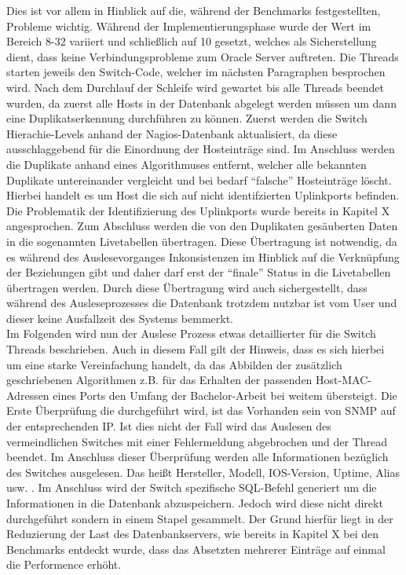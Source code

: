 Dies ist vor allem in Hinblick auf die, während der Benchmarks festgestellten, Probleme wichtig. Während der Implementierungsphase wurde der Wert im Bereich 8-32 variiert und schließlich auf 10 gesetzt, welches als Sicherstellung dient, dass keine Verbindungsprobleme zum Oracle Server auftreten. Die Threads starten jeweils den Switch-Code, welcher im nächsten Paragraphen besprochen wird. Nach dem Durchlauf der Schleife wird gewartet bis alle Threads beendet wurden, da zuerst alle Hosts in der Datenbank abgelegt werden müssen um dann eine Duplikatserkennung durchführen zu können. Zuerst werden die Switch Hierachie-Levels anhand der Nagios-Datenbank aktualisiert, da diese ausschlaggebend für die Einordnung der Hosteinträge sind. Im Anschluss werden die Duplikate anhand eines Algorithmuses entfernt, welcher alle bekannten Duplikate untereinander vergleicht und bei bedarf “falsche” Hosteinträge löscht. Hierbei handelt es um Host die sich auf nicht identifzierten Uplinkports befinden. Die Problematik der Identifizierung des Uplinkports wurde bereits in Kapitel X angesprochen. Zum Abschluss werden die von den Duplikaten gesäuberten Daten in die sogenannten Livetabellen übertragen. Diese Übertragung ist notwendig, da es während des Auslesevorganges Inkonsistenzen im Hinblick auf die Verknüpfung der Beziehungen gibt und daher darf erst der “finale” Status in die Livetabellen übertragen werden. Durch diese Übertragung wird auch sichergestellt, dass während des Ausleseprozesses die Datenbank trotzdem nutzbar ist vom User und dieser keine Ausfallzeit des Systems bemmerkt.\\
Im Folgenden wird nun der Auslese Prozess etwas detaillierter für die Switch Threads beschrieben. Auch in diesem Fall gilt der Hinweis, dass es sich hierbei um eine starke Vereinfachung handelt, da das Abbilden der zusätzlich geschriebenen Algorithmen z.B. für das Erhalten der passenden Host-MAC-Adressen eines Ports den Umfang der Bachelor-Arbeit bei weitem übersteigt. 
Die Erste Überprüfung die durchgeführt wird, ist das Vorhanden sein von SNMP auf der entsprechenden IP. Ist dies nicht der Fall wird das Auslesen des vermeindlichen Switches mit einer Fehlermeldung abgebrochen und der Thread beendet. Im Anschluss dieser Überprüfung werden alle Informationen bezüglich des Switches ausgelesen. Das heißt Hersteller, Modell, IOS-Version, Uptime, Alias usw. . Im Anschluss wird der Switch spezifische SQL-Befehl generiert um die Informationen in die Datenbank abzuspeichern. Jedoch wird diese nicht direkt durchgeführt sondern in einem Stapel gesammelt. Der Grund hierfür liegt in der Reduzierung der Last des Datenbankservers, wie bereits in Kapitel X bei den Benchmarks entdeckt wurde, dass das Absetzten mehrerer Einträge auf einmal die Performence erhöht.
